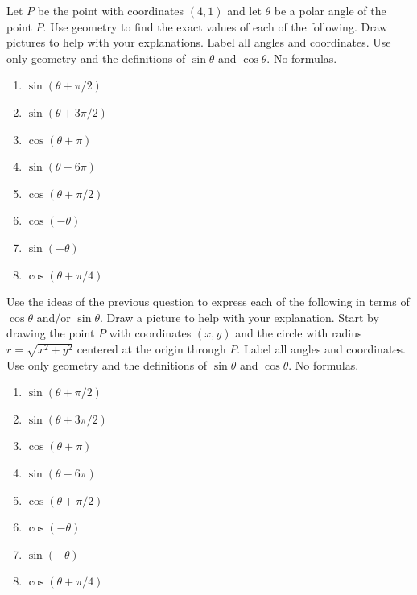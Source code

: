 \documentclass{ximera}
\begin{document}
\begin{question} \label{Qpfrfsfd}
Let $P$ be the point with coordinates $(4,1)$ and let $\theta$ be a polar angle of the point $P$. Use geometry to find the exact values of each of the following. Draw pictures to help with your explanations. Label all angles and coordinates. Use only geometry and the definitions of $\sin\theta$ and $\cos\theta$. No formulas.

\begin{enumerate}
\item $\sin(\theta + \pi/2)$

\item $\sin(\theta + 3\pi/2)$

\item $\cos (\theta + \pi)$

\item $\sin(\theta - 6\pi)$

\item $\cos(\theta + \pi/2)$

\item $\cos(-\theta)$

\item $\sin(-\theta)$

\item $\cos(\theta + \pi/4)$
\end{enumerate}
\end{question}

\begin{question} \label{Qdfefr30}
Use the ideas of the previous question to express each of the following in terms of $\cos\theta$ and/or $\sin\theta$. Draw a picture to help with your explanation. Start by drawing the point $P$ with coordinates $(x,y)$ and the circle with radius $r=\sqrt{x^2 + y^2}$ centered at the origin through $P$. Label all angles and coordinates. Use only geometry and the definitions of $\sin\theta$ and $\cos\theta$. No formulas. 

\begin{enumerate}
\item $\sin(\theta + \pi/2)$

\item $\sin(\theta + 3\pi/2)$

\item $\cos (\theta + \pi)$

\item $\sin(\theta - 6\pi)$

\item $\cos(\theta + \pi/2)$

\item $\cos(-\theta)$

\item $\sin(-\theta)$

\item $\cos(\theta + \pi/4)$
\end{enumerate}
\end{question}
\end{document}
